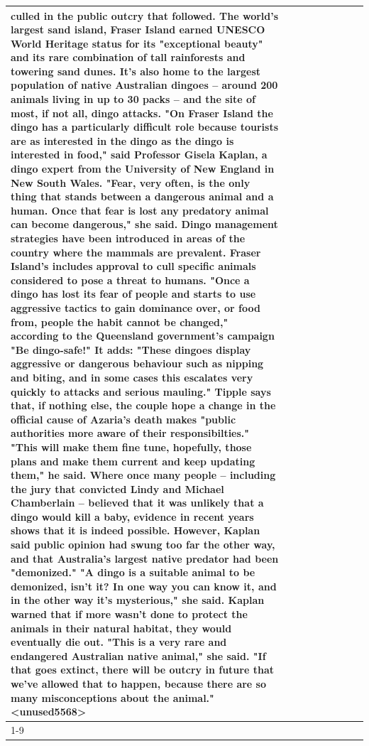 \begin{table}[H]
\begin{tabular}{lllrlllll}
culled in the public outcry that followed. The world's largest sand island, Fraser Island earned UNESCO World Heritage status for its "exceptional beauty" and its rare combination of tall rainforests and towering sand dunes. It's also home to the largest population of native Australian dingoes -- around 200 animals living in up to 30 packs -- and the site of most, if not all, dingo attacks. "On Fraser Island the dingo has a particularly difficult role because tourists are as interested in the dingo as the dingo is interested in food," said Professor Gisela Kaplan, a dingo expert from the University of New England in New South Wales. "Fear, very often, is the only thing that stands between a dangerous animal and a human. Once that fear is lost any predatory animal can become dangerous," she said. Dingo management strategies have been introduced in areas of the country where the mammals are prevalent. Fraser Island's includes approval to cull specific animals considered to pose a threat to humans. "Once a dingo has lost its fear of people and starts to use aggressive tactics to gain dominance over, or food from, people the habit cannot be changed," according to the Queensland government's campaign "Be dingo-safe!" It adds: "These dingoes display aggressive or dangerous behaviour such as nipping and biting, and in some cases this escalates very quickly to attacks and serious mauling." Tipple says that, if nothing else, the couple hope a change in the official cause of Azaria's death makes "public authorities more aware of their responsibilties." "This will make them fine tune, hopefully, those plans and make them current and keep updating them," he said. Where once many people -- including the jury that convicted Lindy and Michael Chamberlain -- believed that it was unlikely that a dingo would kill a baby, evidence in recent years shows that it is indeed possible. However, Kaplan said public opinion had swung too far the other way, and that Australia's largest native predator had been "demonized." "A dingo is a suitable animal to be demonized, isn't it? In one way you can know it, and in the other way it's mysterious," she said. Kaplan warned that if more wasn't done to protect the animals in their natural habitat, they would eventually die out. "This is a very rare and endangered Australian native animal," she said. "If that goes extinct, there will be outcry in future that we've allowed that to happen, because there are so many misconceptions about the animal."<unused5568> \\
\cline{1-9}

\end{tabular}
\end{table}
